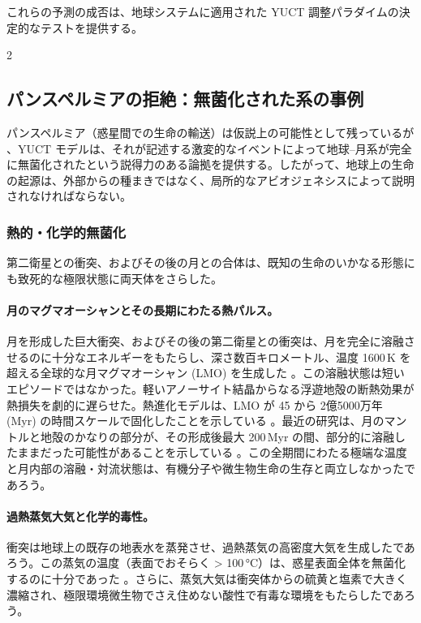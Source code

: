\documentclass[12pt,a4paper]{article}
\begin{document}
	これらの予測の成否は、地球システムに適用された YUCT 調整パラダイムの決定的なテストを提供する。
	
	\begin{multicols}{2}
		
		\subsection{パンスペルミアの拒絶：無菌化された系の事例}
		パンスペルミア（惑星間での生命の輸送）は仮説上の可能性として残っているが \cite{PanspermiaReview}、YUCT モデルは、それが記述する激変的なイベントによって地球–月系が完全に無菌化されたという説得力のある論拠を提供する。したがって、地球上の生命の起源は、外部からの種まきではなく、局所的なアビオジェネシスによって説明されなければならない。
		
		\subsubsection{熱的・化学的無菌化}
		第二衛星との衝突、およびその後の月との合体は、既知の生命のいかなる形態にも致死的な極限状態に両天体をさらした。
		
		\paragraph{月のマグマオーシャンとその長期にわたる熱パルス。}
		月を形成した巨大衝突、およびその後の第二衛星との衝突は、月を完全に溶融させるのに十分なエネルギーをもたらし、深さ数百キロメートル、温度 1600 K を超える全球的な月マグマオーシャン (LMO) を生成した \cite{Sahijpal2020}。この溶融状態は短いエピソードではなかった。軽いアノーサイト結晶からなる浮遊地殻の断熱効果が熱損失を劇的に遅らせた。熱進化モデルは、LMO が 45 から 2億5000万年 (Myr) の時間スケールで固化したことを示している \cite{Colin2024, Maurice2018}。最近の研究は、月のマントルと地殻のかなりの部分が、その形成後最大 200 Myr の間、部分的に溶融したままだった可能性があることを示している \cite{Maurice2020}。この全期間にわたる極端な温度と月内部の溶融・対流状態は、有機分子や微生物生命の生存と両立しなかったであろう。
		
		\paragraph{過熱蒸気大気と化学的毒性。}
		衝突は地球上の既存の地表水を蒸発させ、過熱蒸気の高密度大気を生成したであろう。この蒸気の温度（表面でおそらく > 100 °C）は、惑星表面全体を無菌化するのに十分であった \cite{Zahnle2015}。さらに、蒸気大気は衝突体からの硫黄と塩素で大きく濃縮され、極限環境微生物でさえ住めない酸性で有毒な環境をもたらしたであろう。
		

\end{multicols}
\end{document}
